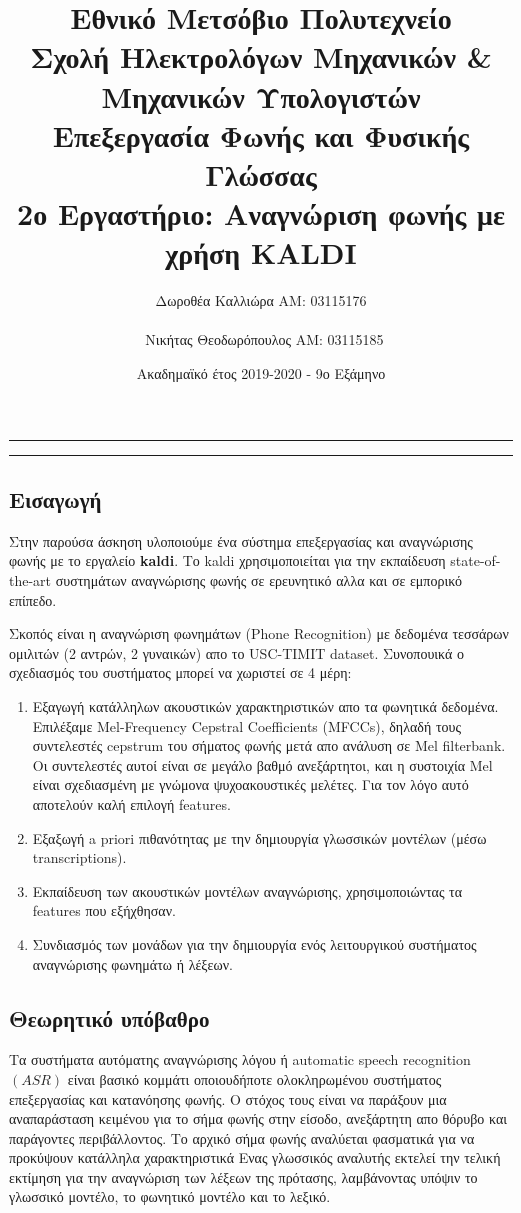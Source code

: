 \documentclass[12pt]{article}
\title{\Large Εθνικό Μετσόβιο Πολυτεχνείο \\
Σχολή Ηλεκτρολόγων Μηχανικών \& Μηχανικών Υπολογιστών\\
Επεξεργασία Φωνής και Φυσικής Γλώσσας\\
2ο Εργαστήριο: Αναγνώριση φωνής με χρήση KALDI}
\author{ \Large  Δωροθέα Καλλιώρα  ΑΜ: 03115176\\ \\
     \Large \ Νικήτας Θεοδωρόπουλος AM: 03115185
        }
\date{Ακαδημαϊκό έτος 2019-2020 - 9ο Εξάμηνο}
\begin{document}
\maketitle
\begin{center}

\end{center}
\bigbreak
\vspace{.5em} \hrule \vspace{.2em} \hrule
\subsection*{Εισαγωγή}
Στην παρούσα άσκηση υλοποιούμε ένα σύστημα επεξεργασίας και αναγνώρισης φωνής με το εργαλείο \textbf{kaldi}. Το kaldi χρησιμοποιείται για την εκπαίδευση state-of-the-art συστημάτων αναγνώρισης φωνής σε ερευνητικό αλλα και σε εμπορικό επίπεδο. 

Σκοπός είναι η αναγνώριση φωνημάτων (Phone Recognition) με δεδομένα τεσσάρων ομιλιτών (2 αντρών, 2 γυναικών) απο το  USC-TIMIT  dataset. Συνοπουικά ο σχεδιασμός του συστήματος μπορεί να χωριστεί σε 4 μέρη:
\begin{enumerate}
  \item Εξαγωγή κατάλληλων ακουστικών χαρακτηριστικών απο τα φωνητικά δεδομένα. Επιλέξαμε Mel-Frequency Cepstral Coefficients (MFCCs), δηλαδή τους συντελεστές cepstrum του σήματος φωνής μετά απο ανάλυση σε Mel filterbank. Οι συντελεστές αυτοί είναι σε μεγάλο βαθμό ανεξάρτητοι,  και η συστοιχία Mel είναι σχεδιασμένη με γνώμονα ψυχοακουστικές μελέτες. Για τον λόγο αυτό αποτελούν καλή επιλογή features. 
  \item Εξαξωγή a priori πιθανότητας με την δημιουργία γλωσσικών μοντέλων (μέσω transcriptions).
  \item Εκπαίδευση των ακουστικών μοντέλων αναγνώρισης, χρησιμοποιώντας τα features που εξήχθησαν. 
  \item Συνδιασμός των μονάδων για την δημιουργία ενός λειτουργικού συστήματος αναγνώρισης φωνημάτω ή λέξεων. 
\end{enumerate}

\subsection*{Θεωρητικό υπόβαθρο}
Τα συστήματα αυτόματης αναγνώρισης λόγου ή automatic speech recognition $(ASR)$  είναι βασικό κομμάτι οποιουδήποτε ολοκληρωμένου συστήματος επεξεργασίας και κατανόησης φωνής. Ο στόχος τους είναι να παράξουν μια αναπαράσταση κειμένου για το σήμα φωνής στην είσοδο, ανεξάρτητη απο θόρυβο και παράγοντες περιβάλλοντος. Το αρχικό σήμα φωνής αναλύεται φασματικά για να προκύψουν κατάλληλα χαρακτηριστικά Ενας γλωσσικός αναλυτής εκτελεί την τελική εκτίμηση για την  αναγνώριση των λέξεων της πρότασης, λαμβάνοντας υπόψιν το γλωσσικό μοντέλο, το φωνητικό μοντέλο και το λεξικό.
\end{document}
